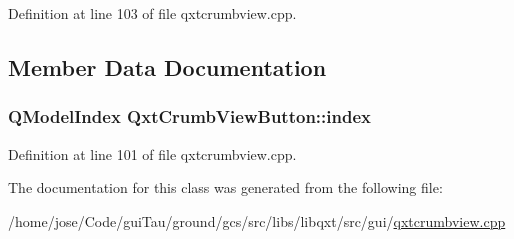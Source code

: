 Definition at line 103 of file qxtcrumbview.\-cpp.



\subsection{Member Data Documentation}
\hypertarget{class_qxt_crumb_view_button_adcdd9b55e7bf206597860f1dbdc4c94b}{
\subsubsection[{index}]{\setlength{\rightskip}{0pt plus 5cm}Q\-Model\-Index Qxt\-Crumb\-View\-Button\-::index}}\label{class_qxt_crumb_view_button_adcdd9b55e7bf206597860f1dbdc4c94b}


Definition at line 101 of file qxtcrumbview.\-cpp.



The documentation for this class was generated from the following file\-:\begin{DoxyCompactItemize}
\item 
/home/jose/\-Code/gui\-Tau/ground/gcs/src/libs/libqxt/src/gui/\hyperlink{qxtcrumbview_8cpp}{qxtcrumbview.\-cpp}\end{DoxyCompactItemize}
